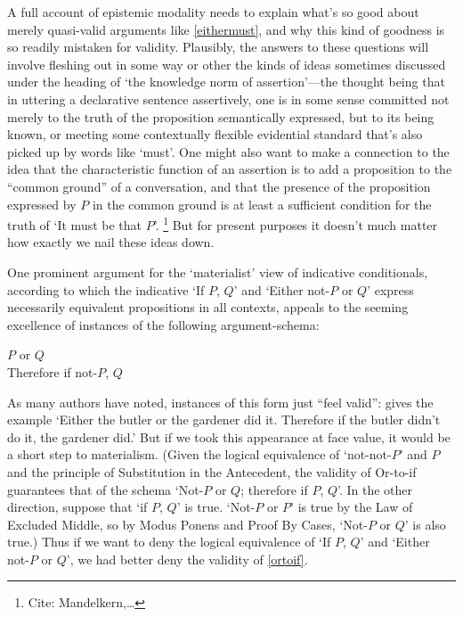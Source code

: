 \documentclass[If.tex]{subfiles}
\begin{document}
A full account of epistemic modality needs to explain what's so good about merely quasi-valid arguments like \ref{eithermust}, and why this kind of goodness is so readily mistaken for validity.  Plausibly, the answers to these questions will involve fleshing out in some way or other the kinds of ideas sometimes discussed under the heading of ‘the knowledge norm of assertion’---the thought being that in uttering a declarative sentence assertively, one is in some sense committed not merely to the truth of the proposition semantically expressed, but to its being known, or meeting some contextually flexible evidential standard that's also picked up by words like ‘must’.  One might also want to make a connection to the idea \citep{StalnakerAssertion} that the characteristic function of an assertion is to add a proposition to the “common ground” of a conversation, and that the presence of the proposition expressed by $P$ in the common ground is at least a sufficient condition for the truth of ‘It must be that $P$’.%
\footnote{Cite: Mandelkern,…}  
But for present purposes it doesn't much matter how exactly we nail these ideas down.  

One prominent argument for the ‘materialist’ view of indicative conditionals, according to which the indicative ‘If $P$, $Q$’ and ‘Either not-$P$ or $Q$’ express necessarily equivalent propositions in all contexts, appeals to the seeming excellence of instances of the following argument-schema:
\begin{prop}
	\sitem[Or-to-if] \label{ortoif}
	\parbox[t]{\linewidth}{$P$ or $Q$\\
	Therefore if not-$P$, $Q$}
\end{prop}
As many authors have noted, instances of this form just “feel valid”: \citet{StalnakerIC} gives the example ‘Either the butler or the gardener did it.  Therefore if the butler didn't do it, the gardener did.’  But if we took this appearance at face value, it would be a short step to materialism.  (Given the logical equivalence of ‘not-not-$P$’ and $P$ and the principle of Substitution in the Antecedent, the validity of Or-to-if guarantees that of the schema ‘Not-$P$ or $Q$; therefore if $P$, $Q$’.  In the other direction, suppose that ‘if $P$, $Q$’ is true.   ‘Not-$P$ or $P$’ is true by the Law of Excluded Middle, so by Modus Ponens and Proof By Cases, ‘Not-$P$ or $Q$’ is also true.)  Thus if we want to deny the logical equivalence of ‘If $P$, $Q$’ and ‘Either not-$P$ or $Q$’, we had better deny the validity of \ref{ortoif}.  
\end{document}
